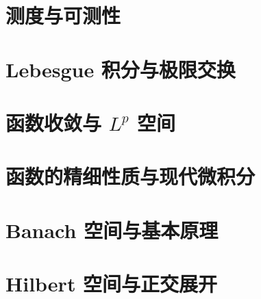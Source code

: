 \documentclass[UTF8,zihao=-4,openany,fontset=fandol]{ctexbook}
\begin{document}
\part{测度与可测性}






\part{Lebesgue 积分与极限交换}






\part{函数收敛与 \texorpdfstring{\(L^p\)}{Lp} 空间}







\part{函数的精细性质与现代微积分}






\part{Banach 空间与基本原理}






\part{Hilbert 空间与正交展开}


\end{document}
